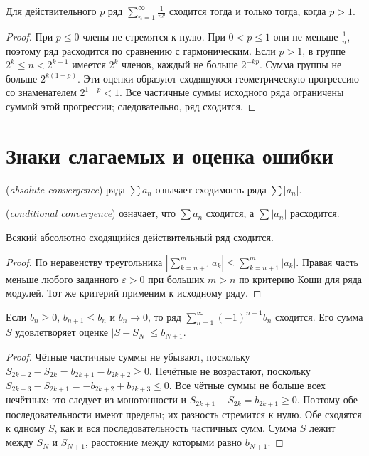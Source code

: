 \begin{theorem}\label{thm:legacy-c30-6}
Для действительного \(p\) ряд \(\sum_{n=1}^\infty\frac1{n^p}\) сходится тогда и только тогда, когда \(p>1\).
\end{theorem}
\begin{proof}
При \(p\le0\) члены не стремятся к нулю. При \(0<p\le1\) они не меньше \(\frac1n\), поэтому ряд расходится по сравнению с гармоническим.
Если \(p>1\), в группе \(2^k\le n<2^{k+1}\) имеется \(2^k\) членов, каждый не больше \(2^{-kp}\). Сумма группы не больше \(2^{k(1-p)}\). Эти оценки образуют сходящуюся геометрическую прогрессию со знаменателем \(2^{1-p}<1\). Все частичные суммы исходного ряда ограничены суммой этой прогрессии; следовательно, ряд сходится.
\end{proof}
\section{Знаки слагаемых и оценка ошибки}
\begin{definition}
 (\emph{absolute convergence}) ряда \(\sum a_n\) означает сходимость ряда \(\sum|a_n|\).
\end{definition}
\begin{definition}
 (\emph{conditional convergence}) означает, что \(\sum a_n\) сходится, а \(\sum|a_n|\) расходится.
\end{definition}
\begin{theorem}\label{thm:legacy-c30-7}
Всякий абсолютно сходящийся действительный ряд сходится.
\end{theorem}
\begin{proof}
По неравенству треугольника \(\left|\sum_{k=n+1}^m a_k\right|\le\sum_{k=n+1}^m|a_k|\). Правая часть меньше любого заданного \(\varepsilon>0\) при больших \(m>n\) по критерию Коши для ряда модулей. Тот же критерий применим к исходному ряду.
\end{proof}
\begin{theorem}\label{thm:legacy-c30-8}
Если \(b_n\ge0\), \(b_{n+1}\le b_n\) и \(b_n\to0\), то ряд \(\sum_{n=1}^\infty(-1)^{n-1}b_n\) сходится. Его сумма \(S\) удовлетворяет оценке \(|S-S_N|\le b_{N+1}\).
\end{theorem}
\begin{proof}
Чётные частичные суммы не убывают, поскольку \(S_{2k+2}-S_{2k}=b_{2k+1}-b_{2k+2}\ge0\). Нечётные не возрастают, поскольку \(S_{2k+3}-S_{2k+1}=-b_{2k+2}+b_{2k+3}\le0\). Все чётные суммы не больше всех нечётных: это следует из монотонности и \(S_{2k+1}-S_{2k}=b_{2k+1}\ge0\). Поэтому обе последовательности имеют пределы; их разность стремится к нулю. Обе сходятся к одному \(S\), как и вся последовательность частичных сумм. Сумма \(S\) лежит между \(S_N\) и \(S_{N+1}\), расстояние между которыми равно \(b_{N+1}\).
\end{proof}

